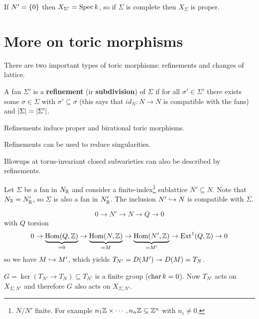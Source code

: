\begin{remark}
If $N'=\left\{{0}\right\}$ then $X_{\Sigma'}=\operatorname{Spec} k$, so if $\Sigma$ is complete then $X_\Sigma$ is proper.
\end{remark}



\section{More on toric morphisms}
There are two important types of toric morphisms: refinements and changes of lattice.

\begin{definition}[]
A fan $\Sigma'$ is a \textbf{refinement} (ir \textbf{subdivision}) of $\Sigma$ if for all $\sigma'\in \Sigma'$ there exists some $\sigma\in \Sigma$ with $\sigma'\subseteq \sigma$ (this says that $id_N:N\to N$ is compatible with the fans) and $\left|{\Sigma}\right|=\left|{\Sigma'}\right|$.
\end{definition}


\begin{theorem}[]\label{ThRefinementsGiveProperBirational}
Refinements induce proper and birational toric morphisms.
\end{theorem}

\begin{remark}
Refinements can be used to reduce singularities.
\end{remark}

\begin{fact}[]
Blowups at torus-invariant closed subvarieties can also be described by refinements.
\end{fact}


\begin{definition}[]
Let $\Sigma$ be a fan in $N_{\mathbb{R}}$ and consider a finite-index\footnote{$N/N'$ finite. For example $n_1\mathbb{Z}\times\cdots, n_n\mathbb{Z}\subseteq \mathbb{Z}^n$ with $n_i\neq 0$.} sublattice $N'\subseteq N$. Note that $N_{\mathbb{R}}=N'_{\mathbb{R}}$, so $\Sigma$ is also a fan in $N'_{\mathbb{R}}$. The inclusion $N'\hookrightarrow N$ is compatible with $\Sigma$.
\end{definition}

\[0\to N'\to N\to Q\to 0\]
with $Q$ torsion
\[0\to \underset{=0}{\underbrace{\operatorname{Hom}(Q,\mathbb{Z})}}\to \underset{=M}{\underbrace{\operatorname{Hom}(N,\mathbb{Z})}}\to \underset{=M'}{\underbrace{\operatorname{Hom}(N',\mathbb{Z})}}\to \operatorname{Ext}^1(Q,\mathbb{Z})\to 0\]
so we have $M\hookrightarrow M'$, which yields $T_{N'}=D(M')\twoheadrightarrow D(M)=T_N$.

$G=\ker(T_{N'}\to T_N)\subseteq T_{N'}$ is a finite group ($\operatorname{char} k=0$). Now $T_{N'}$ acts on $X_{\Sigma,N'}$ and therefore $G$ also acts on $X_{\Sigma,N'}$.

